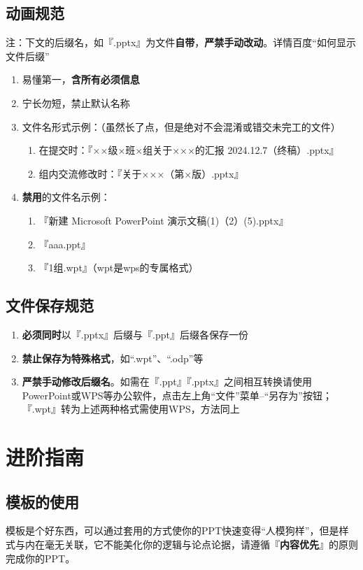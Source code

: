\subsection[动画规范]{动画规范}
注：下文的后缀名，如『.pptx』为文件\textbf{自带}，\textbf{严禁手动改动}。详情百度“如何显示文件后缀”
\begin{enumerate}
    \item 易懂第一，\textbf{含所有必须信息}
    \item 宁长勿短，禁止默认名称
    \item 文件名形式示例：（虽然长了点，但是绝对不会混淆或错交未完工的文件）
          \begin{enumerate}
              \item 在提交时：『××级×班×组关于×××的汇报 2024.12.7（终稿）.pptx』
              \item 组内交流修改时：『关于×××（第×版）.pptx』
          \end{enumerate}
    \item \textbf{禁用}的文件名示例：
          \begin{enumerate}
              \item 『新建 Microsoft PowerPoint 演示文稿(1)（2）(5).pptx』
              \item 『aaa.ppt』
              \item 『1组.wpt』（wpt是wps的专属格式）
          \end{enumerate}
\end{enumerate}

\subsection[文件保存规范]{文件保存规范}
\begin{enumerate}
    \item \textbf{必须同时}以『.pptx』后缀与『.ppt』后缀各保存一份
    \item \textbf{禁止保存为特殊格式}，如“.wpt”、“.odp”等
    \item \textbf{严禁手动修改后缀名}。如需在『.ppt』『.pptx』之间相互转换请使用PowerPoint或WPS等办公软件，点击左上角“文件”菜单--“另存为”按钮；『.wpt』转为上述两种格式需使用WPS，方法同上
\end{enumerate}

\section[进阶指南]{进阶指南}
\subsection[模板的使用]{模板的使用}
模板是个好东西，可以通过套用的方式使你的PPT快速变得“人模狗样”，但是样式与内在毫无关联，它不能美化你的逻辑与论点论据，请遵循『\textbf{内容优先}』的原则完成你的PPT。

